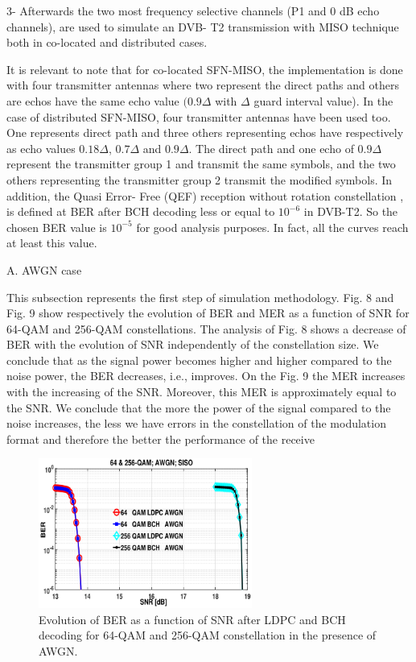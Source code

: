 \documentclass[10pt, conference]{IEEEtran}
\begin{document}
\linespread{1.10}
\normalsize{
3- Afterwards the two most frequency selective channels
(P1 and 0 dB echo channels), are used to simulate an DVB-
T2 transmission with MISO technique both in co-located and
distributed cases.

It is relevant to note that for co-located SFN-MISO, the
implementation is done with four transmitter antennas where
two represent the direct paths and others are echos have
the same echo value $(0.9\Delta$ with $\Delta$ guard interval value). In
the case of distributed SFN-MISO, four transmitter antennas
have been used too. One represents direct path and three
others representing echos have respectively as echo values
$0.18\Delta$, $0.7\Delta$ and $0.9\Delta$. The direct path and one echo of
$0.9\Delta$represent the transmitter group 1 and transmit the same
symbols, and the two others representing the transmitter group
2 transmit the modified symbols. In addition, the Quasi Error-
Free (QEF) reception without rotation constellation \cite{14}, \cite{16}
is defined at BER after BCH decoding less or equal to $10^{-6}$ in
DVB-T2. So the chosen BER value is $10^{-5}$ for good analysis
purposes. In fact, all the curves reach at least this value.

\begin{adjustwidth}{0cm}{0cm}
    \textmd{ A. AWGN case}
\end{adjustwidth}

This subsection represents the first step of simulation
methodology. Fig. 8 and Fig. 9 show respectively the evolution
of BER and MER as a function of SNR for 64-QAM and
256-QAM constellations. The analysis of Fig. 8 shows a
decrease of BER with the evolution of SNR independently of
the constellation size. We conclude that as the signal power
becomes higher and higher compared to the noise power,
the BER decreases, i.e., improves. On the Fig. 9 the MER
increases with the increasing of the SNR. Moreover, this MER
is approximately equal to the SNR. We conclude that the more
the power of the signal compared to the noise increases, the
less we have errors in the constellation of the modulation
format and therefore the better the performance of the receive

\begin{figure}[!htbp]
\centering
\includegraphics[width=7cm]{cap1.png}
\caption{
  \textup{{\footnotesize Evolution of BER as a function of SNR after LDPC and BCH decoding
for 64-QAM and 256-QAM constellation in the presence of AWGN.
}}}
\end{figure}

}
\end{document}
